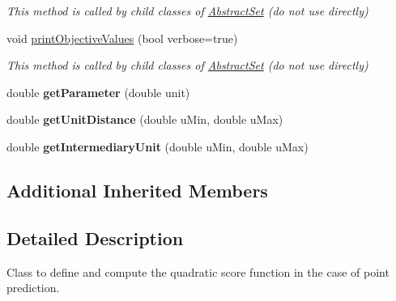 \begin{DoxyCompactItemize}
\begin{DoxyCompactList}\small\item\em This method is called by child classes of \hyperlink{classAbstractSet}{Abstract\-Set} (do not use directly) \end{DoxyCompactList}\item 
\hypertarget{classQuadraticScore_a2f8c56dd472c1d53b407bb8af2fb0868}{void \hyperlink{classQuadraticScore_a2f8c56dd472c1d53b407bb8af2fb0868}{print\-Objective\-Values} (bool verbose=true)}\label{classQuadraticScore_a2f8c56dd472c1d53b407bb8af2fb0868}

\begin{DoxyCompactList}\small\item\em This method is called by child classes of \hyperlink{classAbstractSet}{Abstract\-Set} (do not use directly) \end{DoxyCompactList}\item 
\hypertarget{classQuadraticScore_a83b7d1ba48b1526523b14c7490a211fa}{double {\bfseries get\-Parameter} (double unit)}\label{classQuadraticScore_a83b7d1ba48b1526523b14c7490a211fa}

\item 
\hypertarget{classQuadraticScore_a630eb1cc98dbaa1b7ae8ff3ef6cc21bd}{double {\bfseries get\-Unit\-Distance} (double u\-Min, double u\-Max)}\label{classQuadraticScore_a630eb1cc98dbaa1b7ae8ff3ef6cc21bd}

\item 
\hypertarget{classQuadraticScore_a7716bede5c53ecf6d195582bd22a62a6}{double {\bfseries get\-Intermediary\-Unit} (double u\-Min, double u\-Max)}\label{classQuadraticScore_a7716bede5c53ecf6d195582bd22a62a6}

\end{DoxyCompactItemize}
\subsection*{Additional Inherited Members}


\subsection{Detailed Description}
Class to define and compute the quadratic score function in the case of point prediction. 

